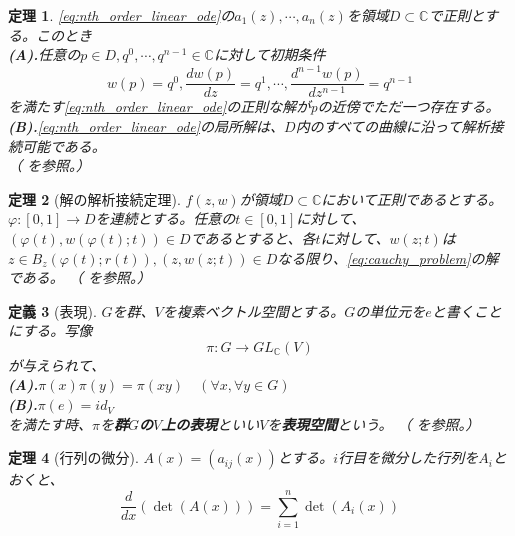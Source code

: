 \documentclass[paper=a4, fontsize=11pt]{jlreq} %
\theoremstyle{break}
\newtheorem{theorem}{定理}[section]
\newtheorem{definition}[theorem]{定義}
\theoremstyle{qa}
\theoremstyle{remark} %
\begin{document}
\begin{theorem}\label{thm:linear_ode_existence_and_continuation}
    \eqref{eq:nth_order_linear_ode}の$a_{1}(z),\cdots,a_{n}(z)$を領域$D\subset\mathbb{C}$で正則とする。このとき\\
    \textbf{(A).}任意の$p\in D,q^{0},\cdots,q^{n-1}\in\mathbb{C}$に対して初期条件
    \[
    w(p)=q^{0},\frac{dw(p)}{dz}=q^{1},\cdots,\frac{d^{n-1}w(p)}{dz^{n-1}}=q^{n-1}
    \]
    を満たす\eqref{eq:nth_order_linear_ode}の正則な解がpの近傍でただ一つ存在する。\\
    \textbf{(B).}\eqref{eq:nth_order_linear_ode}の局所解は、$D$内のすべての曲線に沿って解析接続可能である。\\
    （\cite[p.127 定理25.3]{book:kimura} を参照。）
\end{theorem}
\begin{theorem}[解の解析接続定理]\label{thm:ode_solution_continuation}
   $f(z,w)$が領域$D\subset\mathbb{C}$において正則であるとする。$\varphi:[0,1]\to D$を連続とする。任意の$t\in[0,1]$に対して、$(\varphi(t),w(\varphi(t);t))\in D$であるとすると、各$t$に対して、$w(z;t)$は$z\in B_{z}(\varphi(t);r(t)), (z,w(z;t))\in D$なる限り、\eqref{eq:cauchy_problem}の解である。
   （\cite[p.56 定理8.6]{book:takano} を参照。）
\end{theorem}
\begin{definition}[表現]\label{dfn:representation}
    $G$を群、$V$を複素ベクトル空間とする。$G$の単位元を$e$と書くことにする。写像
    \[
    \pi:G\to GL_{\mathbb{C}}(V)
    \]
    が与えられて、\\
    \textbf{(A).}$\pi(x)\pi(y)=\pi(xy)\quad(\forall x, \forall y\in G)$\\
    \textbf{(B).}$\pi(e)=id_{V}$\\
    を満たす時、$\pi$を\textbf{群$G$の$V$上の表現}といい$V$を\textbf{表現空間}という。
    （\cite[p.10 定義1.12]{book:kobayashi} を参照。）
\end{definition}
\begin{theorem}[行列の微分]\label{thm:derivative-of-determinant}
    $A(x)=(a_{ij}(x))$とする。$i$行目を微分した行列を$A_{i}$とおくと、
    \[
    \frac{d}{dx}(\det(A(x)))=\sum_{i=1}^{n}\det(A_{i}(x))
    \]
\end{theorem}
\end{document}
